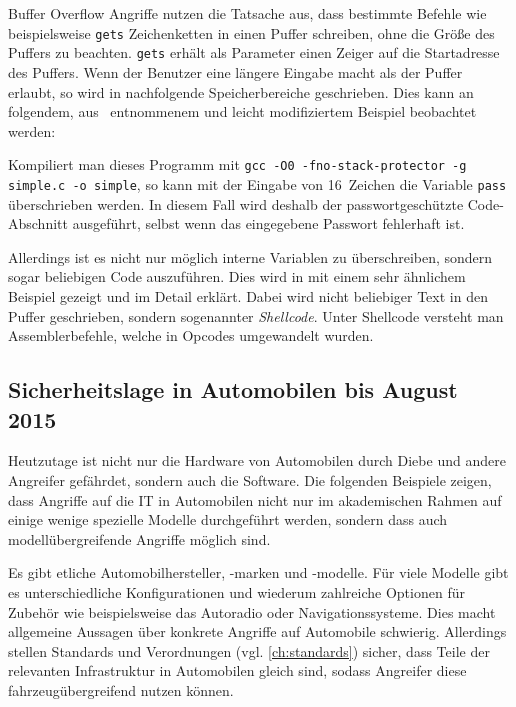 Buffer Overflow Angriffe nutzen die Tatsache aus, dass bestimmte Befehle wie
beispielsweise \verb+gets+ Zeichenketten in einen Puffer schreiben, ohne die
Größe des Puffers zu beachten. \verb+gets+ erhält als Parameter einen Zeiger
auf die Startadresse des Puffers. Wenn der Benutzer eine längere Eingabe macht
als der Puffer erlaubt, so wird in nach\-folgende Speicher\-bereiche
geschrieben. Dies kann an folgendem, aus~\cite{Arora2013} entnommenem und
leicht modifiziertem Beispiel beobachtet werden:



Kompiliert man dieses Programm mit
\texttt{gcc -O0 -fno-stack-protector -g simple.c -o simple}, so kann mit der
Eingabe von 16~Zeichen die Variable \texttt{pass} überschrieben werden. In diesem
Fall wird deshalb der passwortgeschützte Code-Abschnitt ausgeführt, selbst
wenn das eingegebene Passwort fehlerhaft ist.

Allerdings ist es nicht nur möglich interne Variablen zu überschreiben, sondern
sogar beliebigen Code auszuführen. Dies wird in \cite{Mixter} mit einem sehr
ähnlichem Beispiel gezeigt und im Detail erklärt. Dabei wird nicht beliebiger
Text in den Puffer geschrieben, sondern sogenannter \textit{Shellcode}. Unter
Shellcode versteht man Assemblerbefehle, welche in Opcodes umgewandelt wurden.


\subsection{Sicherheitslage in Automobilen bis August 2015}\label{sec:sicherheitslage}
Heutzutage ist nicht nur die Hardware von Automobilen durch Diebe und andere
Angreifer gefährdet, sondern auch die Software. Die folgenden Beispiele zeigen,
dass Angriffe auf die IT in Automobilen nicht nur im akademischen Rahmen
auf einige wenige spezielle Modelle durchgeführt werden, sondern dass auch
modellübergreifende Angriffe möglich sind.

Es gibt etliche Automobilhersteller, -marken und -modelle. Für viele Modelle
gibt es unterschiedliche Konfigurationen und wiederum zahlreiche Optionen für
Zubehör wie beispielsweise das Autoradio oder Navigationssysteme. Dies macht
allgemeine Aussagen über konkrete Angriffe auf Automobile schwierig. Allerdings
stellen Standards und Verordnungen (vgl. \cref{ch:standards}) sicher, dass
Teile der relevanten Infrastruktur in Automobilen gleich sind, sodass Angreifer
diese fahrzeugübergreifend nutzen können.

